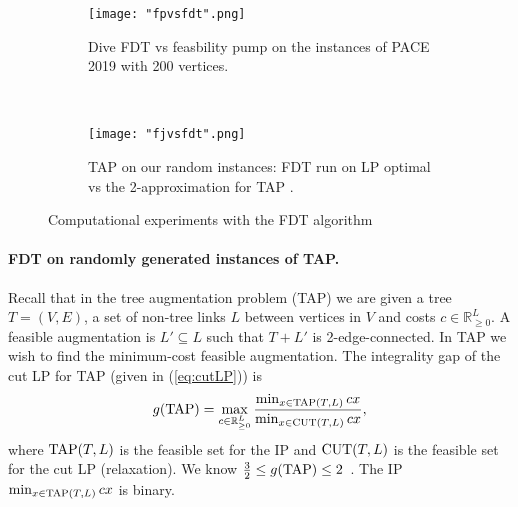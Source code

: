 \begin{figure}[h!]
\begin{subfigure}{.5\textwidth}
\centering
	\texttt{[image: "fpvsfdt".png]}
	\caption{Dive FDT vs feasbility pump on the instances of PACE 2019 \cite{PACE} with 200 vertices.}
	\label{fpvsfdt}
	\end{subfigure}
	$\quad\;$
	\begin{subfigure}{.5\textwidth}
	\centering
	\texttt{[image: "fjvsfdt".png]}
	\caption{TAP on our random instances: FDT run on LP optimal vs the 2-approximation for TAP \cite{FJ81}.}
	\label{fjvsfdt}
	\end{subfigure}
	\caption{Computational experiments with the FDT algorithm}
	\label{fdtcomp}
\end{figure}
\paragraph{FDT on randomly generated instances of TAP.}
Recall that in the tree augmentation problem (TAP) we are given a tree $T=(V,E)$, a set of non-tree links $L$ between vertices in $V$ and costs $c\in \mathbb{R}^{L}_{\geq 0}$. A feasible augmentation is $L'\subseteq L$ such that $T+L'$ is 2-edge-connected. In TAP we wish to find the minimum-cost feasible augmentation. The integrality gap of the cut LP for TAP (given in (\ref{eq:cutLP})) is
\begin{equation*}
g(\operatorname{{{TAP}}}) = \max_{c\in \mathbb{R}^L_{\geq 0}} \frac{\min_{x\in\operatorname{{{TAP}}}(T,L)} cx}{\min_{x\in\operatorname{{{CUT}}}(T,L)} cx},
\end{equation*}  
where $\operatorname{{{TAP}}}(T,L)$ is the feasible set for the IP and $\operatorname{{{CUT}}}(T,L)$ is the feasible set for the cut LP (relaxation).
We know $\frac{3}{2}\leq g(\operatorname{{{TAP}}})\leq 2$~\cite{FJ81,32gaptap}. The IP $\min_{x\in \operatorname{{{TAP}}}(T,L)}cx$ is binary. 

